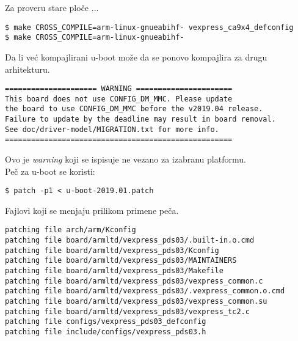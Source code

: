 \documentclass{article}
\begin{document}
Za proveru stare ploče ...

\begin{commandline}
  \begin{verbatim}
$ make CROSS_COMPILE=arm-linux-gnueabihf- vexpress_ca9x4_defconfig
$ make CROSS_COMPILE=arm-linux-gnueabihf-
  \end{verbatim}
\end{commandline}


Da li već kompajlirani u-boot može da se ponovo kompajlira za drugu arhitekturu. \\

\begin{commandline}
  \begin{verbatim}
===================== WARNING ======================
This board does not use CONFIG_DM_MMC. Please update
the board to use CONFIG_DM_MMC before the v2019.04 release.
Failure to update by the deadline may result in board removal.
See doc/driver-model/MIGRATION.txt for more info.
====================================================
  \end{verbatim}
\end{commandline}

Ovo je \textit{warning} koji se ispisuje ne vezano za izabranu platformu. \\

Peč za u-boot se koristi:

\begin{commandline}
  \begin{verbatim}
$ patch -p1 < u-boot-2019.01.patch
  \end{verbatim}
\end{commandline}

Fajlovi koji se menjaju prilikom primene peča.
\begin{commandline}
  \begin{verbatim}
patching file arch/arm/Kconfig
patching file board/armltd/vexpress_pds03/.built-in.o.cmd
patching file board/armltd/vexpress_pds03/Kconfig
patching file board/armltd/vexpress_pds03/MAINTAINERS
patching file board/armltd/vexpress_pds03/Makefile
patching file board/armltd/vexpress_pds03/vexpress_common.c
patching file board/armltd/vexpress_pds03/.vexpress_common.o.cmd
patching file board/armltd/vexpress_pds03/vexpress_common.su
patching file board/armltd/vexpress_pds03/vexpress_tc2.c
patching file configs/vexpress_pds03_defconfig
patching file include/configs/vexpress_pds03.h
  \end{verbatim}
\end{commandline}
\end{document}

